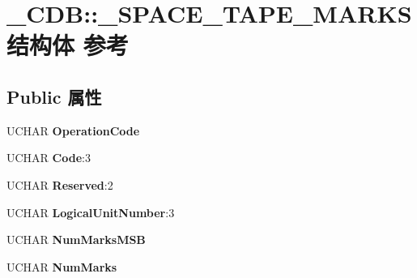\hypertarget{struct___c_d_b_1_1___s_p_a_c_e___t_a_p_e___m_a_r_k_s}{}\section{\+\_\+\+C\+DB\+:\+:\+\_\+\+S\+P\+A\+C\+E\+\_\+\+T\+A\+P\+E\+\_\+\+M\+A\+R\+K\+S结构体 参考}
\label{struct___c_d_b_1_1___s_p_a_c_e___t_a_p_e___m_a_r_k_s}
\subsection*{Public 属性}
\begin{DoxyCompactItemize}
\item 
\mbox{\label{struct___c_d_b_1_1___s_p_a_c_e___t_a_p_e___m_a_r_k_s_a83958399ca7b474f32983b63eddfec38}} 
U\+C\+H\+AR {\bfseries Operation\+Code}
\item 
\mbox{\label{struct___c_d_b_1_1___s_p_a_c_e___t_a_p_e___m_a_r_k_s_ace13eb83a2ccfba4edc1ee3891541aac}} 
U\+C\+H\+AR {\bfseries Code}\+:3
\item 
\mbox{\label{struct___c_d_b_1_1___s_p_a_c_e___t_a_p_e___m_a_r_k_s_af5bdd8d7f021efe3a057aba6ca3feb9e}} 
U\+C\+H\+AR {\bfseries Reserved}\+:2
\item 
\mbox{\label{struct___c_d_b_1_1___s_p_a_c_e___t_a_p_e___m_a_r_k_s_aaa1891d0d3239d0fbf3e39acc49e3ccd}} 
U\+C\+H\+AR {\bfseries Logical\+Unit\+Number}\+:3
\item 
\mbox{\label{struct___c_d_b_1_1___s_p_a_c_e___t_a_p_e___m_a_r_k_s_ac78300718e43cb2f224a574940e404c5}} 
U\+C\+H\+AR {\bfseries Num\+Marks\+M\+SB}
\item 
\mbox{\label{struct___c_d_b_1_1___s_p_a_c_e___t_a_p_e___m_a_r_k_s_a0d85ba1536b14e89e69b1ace3cdd585e}} 
U\+C\+H\+AR {\bfseries Num\+Marks}
\item 
\mbox{\label{struct___c_d_b_1_1___s_p_a_c_e___t_a_p_e___m_a_r_k_s_a19af8746d81ce7760134d6572facfdcd}} 

\end{DoxyCompactItemize}
